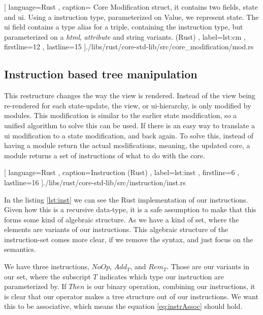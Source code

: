 \begin{center}
  
    [ language=Rust
    , caption={
      Core Modification struct, it contains two fields, state and ui. Using a
      instruction type, parameterized on Value, we represent state. The ui field
      contains a type alias for a triple, containing the instruction type, but
      parameterized on a \textit{html}, \textit{attribute} and string variants.
      (Rust)
    }
    , label=lst:cm
    , firstline=12
    , lastline=15
    ]{./libs/rust/core-std-lib/src/core_modification/mod.rs}
\end{center}

\subsection{Instruction based tree manipulation}

This restructure changes the way the view is rendered. Instead of the view being
re-rendered for each state-update, the view, or \gls*{ui}-hierarchy, is only
modified by modules. This modification is similar to the earlier state
modification, so a unified algorithm to solve this can be used. If there is an
easy way to translate a \gls*{ui} modification to a state modification, and back
again. To solve this, instead of having a module return the actual
modifications, meaning, the updated core, a module returns a set of instructions
of what to do with the core.

\begin{code}[H]
  
   [ language=Rust
   , caption={Instruction (Rust)}
   , label=lst:inst
   , firstline=6
   , lastline=16
   ]{./libs/rust/core-std-lib/src/instruction/inst.rs}
\end{code}

In the listing \ref{lst:inst} we can see the Rust implementation of our
instructions. Given how this is a recursive data-type, it is a safe assumption
to make that this forms some kind of algebraic structure. As we have a kind of
set, where the elements are variants of our instructions. This algebraic
structure of the instruction-set comes more clear, if we remove the syntax, and
just focus on the semantics.

We have three instructions, $NoOp$, $Add_T$, and $Rem_T$. Those are our variants
in our set, where the subscript $T$ indicates which type our instruction are
parameterized by. If $Then$ is our binary operation, combining our instructions,
it is clear that our operator makes a tree structure out of our instructions. We
want this to be associative, which means the equation \ref{eq:instrAssoc} should
hold.

